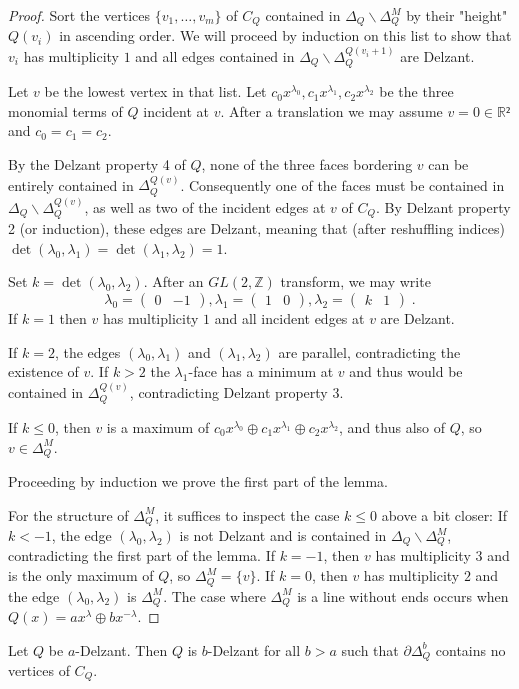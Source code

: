 \documentclass[12pt,a4paper,abstract=true,draft]{scrartcl}
\newcommand\mqty[1]{\begin{pmatrix}#1\end{pmatrix}}
\begin{document}
\begin{proof}
  Sort the vertices $\{v_1,…,v_m\}$ of $C_Q$ contained in $Δ_Q ∖ Δ_Q^M$ by their "height" $Q(v_i)$ in ascending order.
  We will proceed by induction on this list to show that $v_i$ has multiplicity $1$ and all edges contained in $Δ_Q ∖ Δ_Q^{Q(v_i+1)}$ are Delzant.

  Let $v$ be the lowest vertex in that list.
  Let $c_0  x^{λ_0},c_1  x^{λ_1},c_2  x^{λ_2}$ be the three monomial terms of $Q$ incident at $v$.
  After a translation we may assume $v=0 ∈ ℝ²$ and $c_0 = c_1 = c_2$.

  By the Delzant property 4 of $Q$, none of the three faces bordering $v$ can be entirely contained in $Δ_Q^{Q(v)}$.
  Consequently one of the faces must be contained in $Δ_Q ∖ Δ_Q^{Q(v)}$, as well as two of the incident edges at $v$ of $C_Q$.
  By Delzant property 2 (or induction), these edges are Delzant, meaning that (after reshuffling indices) $\det(λ_0,λ_1) = \det(λ_1,λ_2) = 1$.

  Set $k = \det(λ_0,λ_2)$.
  After an $GL(2,ℤ)$ transform, we may write
  \[ λ_0 = \mqty{0 & -1}, λ_1 = \mqty{1 & 0}, λ_2 = \mqty{k & 1} \;. \]
  If $k=1$ then $v$ has multiplicity $1$ and all incident edges at $v$ are Delzant.

  If $k = 2$, the edges $(λ_0,λ_1)$ and $(λ_1,λ_2)$ are parallel, contradicting the existence of $v$.
  If $k > 2$ the $λ_1$-face has a minimum at $v$ and thus would be contained in $Δ_Q^{Q(v)}$, contradicting Delzant property 3.

  If $k ≤ 0$, then $v$ is a maximum of $c_0  x^{λ_0} ⊕ c_1  x^{λ_1} ⊕ c_2  x^{λ_2}$, and thus also of $Q$, so $v ∈ Δ_Q^M$.

  Proceeding by induction we prove the first part of the lemma.

  For the structure of $Δ_Q^M$, it suffices to inspect the case $k ≤ 0$ above a bit closer:
  If $k<-1$, the edge $(λ_0,λ_2)$ is not Delzant and is contained in $Δ_Q ∖ Δ_Q^M$, contradicting the first part of the lemma.
  If $k=-1$, then $v$ has multiplicity $3$ and is the only maximum of $Q$, so $Δ_Q^M = \{v\}$.
  If $k=0$, then $v$ has multiplicity $2$ and the edge $(λ_0,λ_2)$ is $Δ_Q^M$.
  The case where $Δ_Q^M$ is a line without ends occurs when $Q(x) = ax^{λ} ⊕ bx^{-λ}$.
\end{proof}

\begin{corollary}
  Let $Q$ be $a$-Delzant.
  Then $Q$ is $b$-Delzant for all $b>a$ such that $∂Δ_Q^b$ contains no vertices of $C_Q$.
\end{corollary}
\end{document}

